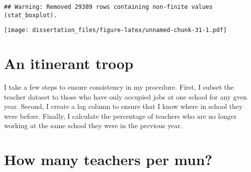 \documentclass[12pt,]{book}
\newenvironment{Shaded}{\begin{snugshade}}{\end{snugshade}}
\newcommand{\DataTypeTok}[1]{\textcolor[rgb]{0.13,0.29,0.53}{#1}}
\newcommand{\DecValTok}[1]{\textcolor[rgb]{0.00,0.00,0.81}{#1}}
\newcommand{\KeywordTok}[1]{\textcolor[rgb]{0.13,0.29,0.53}{\textbf{#1}}}
\newcommand{\NormalTok}[1]{#1}
\newcommand{\OperatorTok}[1]{\textcolor[rgb]{0.81,0.36,0.00}{\textbf{#1}}}
\newcommand{\StringTok}[1]{\textcolor[rgb]{0.31,0.60,0.02}{#1}}
\begin{document}
\begin{Shaded}
\end{Shaded}

\begin{verbatim}
## Warning: Removed 29389 rows containing non-finite values (stat_boxplot).
\end{verbatim}

\texttt{[image: dissertation\_files/figure-latex/unnamed-chunk-31-1.pdf]}

\hypertarget{an-itinerant-troop}{%
\chapter{An itinerant troop}\label{an-itinerant-troop}}

I take a few steps to ensure consistency in my procedure. First, I subset the teacher dataset to those who have only occupied jobs at one school for any gven year. Second, I create a lag column to ensure that I know where in school they were before. Finally, I calculate the percentage of teachers who are no longer working at the same school they were in the previous year.

\hypertarget{how-many-teachers-per-mun}{%
\chapter{How many teachers per mun?}\label{how-many-teachers-per-mun}}

\begin{Shaded}
\end{Shaded}
\end{document}
